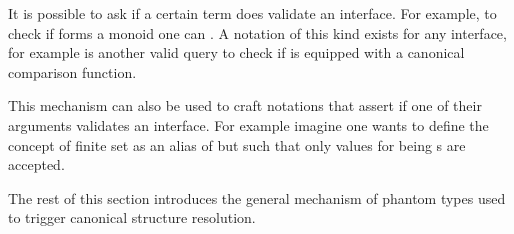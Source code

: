 It is possible to  ask \Coq{} if a certain term does validate an
interface.  For example, to check if  forms a monoid one can
.  A notation of this kind exists for any
interface, for example  is another valid query to
check if  is equipped with a canonical comparison function.

This mechanism can also be used to craft notations that assert
if one of their arguments validates an interface.  For example
imagine one wants to define the concept of finite set as an
alias of  but such that only values for  being
s are accepted.

The rest of this section introduces the general mechanism of phantom
types used to trigger canonical structure resolution.


% 
% 
% 
% 

